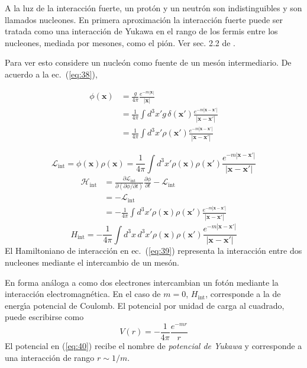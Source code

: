 A la luz de la interacci\'on fuerte, un prot\'on y un neutr\'on son
indistinguibles y son llamados nucleones. En primera aproximaci\'on la
interacci\'on fuerte puede ser tratada como una interacci\'on de Yukawa en
el rango de los fermis entre los nucleones, mediada por mesones, como el pi\'on. Ver sec. 2.2 de \cite{Aitchison:2003tq}.


Para ver esto considere un nucle\'on como fuente de un mes\'on
intermediario. De acuerdo a la ec.~(\ref{eq:38}),
\begin{frame}
\begin{align}
  \phi(\mathbf{x})&=\frac{g}{4\pi}\frac{e^{-m|\mathbf{x}|}}{|\mathbf{x}|}\nonumber\\
  &=\frac{1}{4\pi}\int d^3x'g\,\delta(\mathbf{x}')\frac{e^{-m|\mathbf{x}-\mathbf{x}'|}}{|\mathbf{x}-\mathbf{x}'|}\nonumber\\
  &=\frac{1}{4\pi}\int d^3x'\rho(\mathbf{x}')\frac{e^{-m|\mathbf{x}-\mathbf{x}'|}}{|\mathbf{x}-\mathbf{x}'|}
\end{align}

\begin{equation}
  \mathcal{L}_{\text{int}}=\phi(\mathbf{x})\rho(\mathbf{x})=\frac{1}{4\pi}\int d^3x'\rho(\mathbf{x})\rho(\mathbf{x}')\frac{e^{-m|\mathbf{x}-\mathbf{x}'|}}{|\mathbf{x}-\mathbf{x}'|}
\end{equation}
\begin{align}
  \mathcal{H}_{\text{int}}&=\frac{\partial\mathcal{L}_{\text{int}}}{\partial(\partial\phi/\partial t)}\frac{\partial\phi}{\partial t}-\mathcal{L}_{\text{int}}\nonumber\\
  &=-\mathcal{L}_{\text{int}}\nonumber\\
  &=-\frac{1}{4\pi}\int d^3x'\rho(\mathbf{x})\rho(\mathbf{x}')\frac{e^{-m|\mathbf{x}-\mathbf{x}'|}}{|\mathbf{x}-\mathbf{x}'|}
\end{align}
\begin{equation}
  \label{eq:39}
  H_{\text{int}}=-\frac{1}{4\pi}\int d^3x\,d^3x'\rho(\mathbf{x})\rho(\mathbf{x}')\frac{e^{-m|\mathbf{x}-\mathbf{x}'|}}{|\mathbf{x}-\mathbf{x}'|}
\end{equation}
El Hamiltoniano de interacci\'on en ec.~(\ref{eq:39}) representa la
interacci\'on entre dos nucleones mediante el intercambio de un mes\'on.
\end{frame}
En forma an\'aloga a como dos electrones intercambian un fot\'on mediante
la interacci\'on electromagn\'etica. En el caso de $m=0$,
$H_{\text{int}}$, corresponde a la de energ\'\i a potencial de Coulomb. El
potencial por unidad de carga al cuadrado, puede escribirse como
\begin{equation}
  \label{eq:40}
    V(r)=-\frac{1}{4\pi}\frac{e^{-mr}}{r}
\end{equation}
El potencial en (\ref{eq:40}) recibe el nombre de \emph{potencial de
  Yukawa} y corresponde a una interacci\'on de rango $r\sim1/m$. 

